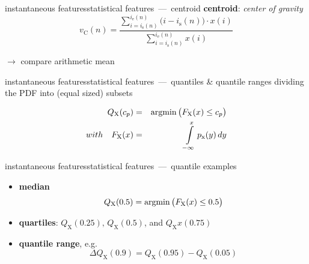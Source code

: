         \begin{frame}{instantaneous features}{statistical features~---~centroid}
            \textbf{centroid}: \textit{center of gravity}
			\begin{equation*}\label{eq:centroid}
				v_{\mathrm{C}}(n) = \frac{\sum\limits_{i=i_{\mathrm{s}}(n)}^{i_{\mathrm{e}}(n)}{\big(i-i_{\mathrm{s}}(n)\big)\cdot x(i)}}{\sum\limits_{i=i_{\mathrm{s}}(n)}^{i_{\mathrm{e}}(n)}{x(i)}} 
			\end{equation*}
            
            \pause
            
            $\rightarrow$ compare arithmetic mean
        \end{frame}
		\begin{frame}{instantaneous features}{statistical features~---~quantiles \& quantile ranges}
			dividing the PDF into (equal sized) subsets
            \begin{footnotesize}
			\begin{eqnarray*}
				Q_\mathrm{X}(c_p) &=& \operatorname*{argmin}\big (F_\mathrm{X}(x) \leq c_p\big)\\
                with\quad F_\mathrm{X}(x) &=& {\int\limits_{-\infty}^{x}{p_\mathrm{x}(y)\, dy}}
			\end{eqnarray*}
            \end{footnotesize}
        \end{frame}
		\begin{frame}{instantaneous features}{statistical features~---~quantile examples}
			\begin{itemize}
				\item	\textbf{median}
						\pause
						\begin{equation*}\label{eq:median}
							Q_\mathrm{X}(0.5) = \operatorname*{argmin}\big (F_\mathrm{X}(x) \leq 0.5\big)
						\end{equation*}
				\bigskip
				\item<2->	\textbf{quartiles}: $Q_\mathrm{X}(0.25),\, Q_\mathrm{X}(0.5)$, and $Q_\mathrm{X}x(0.75)$
				\bigskip
                \item<3->	\textbf{quantile range}, e.g.
						\begin{equation*}
							\Delta Q_\mathrm{X}(0.9) = Q_\mathrm{X}(0.95)-Q_\mathrm{X}(0.05)
						\end{equation*}
			\end{itemize}
        \end{frame}
